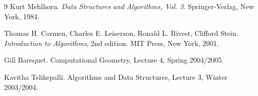 \documentclass[11pt]{article}
\begin{document}
\begin{thebibliography}{9}
Kurt Mehlhorn.
\newblock \textit{Data Structures and Algorithms, Vol. 3}.
\newblock Springer-Verlag, New York, 1984.

Thomas H. Cormen, Charles E. Leiserson, Ronald L. Rivest, Clifford Stein.
\newblock \textit{Introduction to Algorithms}, 2nd edition.
\newblock MIT Press, New York, 2001.

Gill Barequet.
\newblock Computational Geometry, Lecture 4, Spring 2004/2005.

Kavitha Telikepalli.
\newblock Algorithms and Data Structures, Lecture 3, Winter 2003/2004.
\end{thebibliography}
\end{document}
